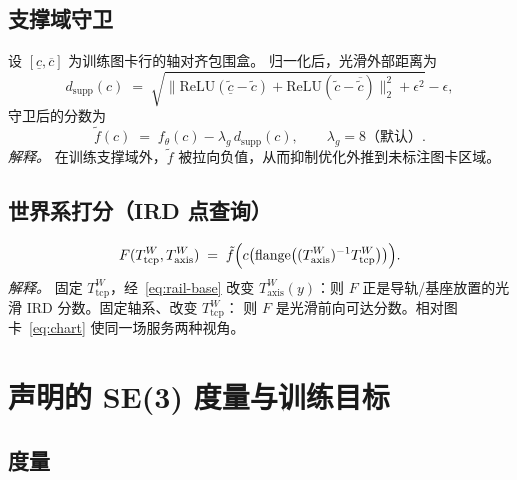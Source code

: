 \documentclass[UTF8,a4paper,11pt,fontset=fandol]{ctexart}
\newcommand{\Tcp}{T_{\mathrm{tcp}}}
\newcommand{\Taxis}{T_{\mathrm{axis}}}
\begin{document}
\subsection{支撑域守卫}
\label{sec:guard}

设 \([\underline c,\overline c]\) 为训练图卡行的轴对齐包围盒。
归一化后，光滑外部距离为
\begin{equation}
\label{eq:support-dist}
  d_{\mathrm{supp}}(c)
  \;=\;
  \sqrt{
    \bigl\|
      \mathrm{ReLU}(\underline{\tilde c}-\tilde c)
      +
      \mathrm{ReLU}(\tilde c-\overline{\tilde c})
    \bigr\|_{2}^{2}
    +\epsilon^{2}
  }
  -\epsilon,
\end{equation}
守卫后的分数为
\begin{equation}
\label{eq:guarded}
  \tilde f(c)
  \;=\;
  f_{\theta}(c)
  -
  \lambda_{g}\, d_{\mathrm{supp}}(c),
  \qquad
  \lambda_{g}=8\text{（默认）}.
\end{equation}
\emph{解释。}
在训练支撑域外，\(\tilde f\) 被拉向负值，从而抑制优化外推到未标注图卡区域。

\subsection{世界系打分（IRD 点查询）}
\label{sec:score-world}

\begin{equation}
\label{eq:score-world}
  F(\Tcp^{W},\Taxis^{W})
  \;=\;
  \tilde f\Bigl(
    c\bigl(
      \mathrm{flange}\bigl(
        (\Taxis^{W})^{-1}\Tcp^{W}
      \bigr)
    \bigr)
  \Bigr).
\end{equation}
\emph{解释。}
固定 \(\Tcp^{W}\)，经~\eqref{eq:rail-base} 改变 \(\Taxis^{W}(y)\)：则
\(F\) 正是导轨/基座放置的光滑 IRD 分数。固定轴系、改变 \(\Tcp^{W}\)：
则 \(F\) 是光滑前向可达分数。相对图卡~\eqref{eq:chart} 使同一场服务两种视角。

\section{声明的 SE(3) 度量与训练目标}
\label{sec:training}

\subsection{度量}
\label{sec:metric}
\end{document}
